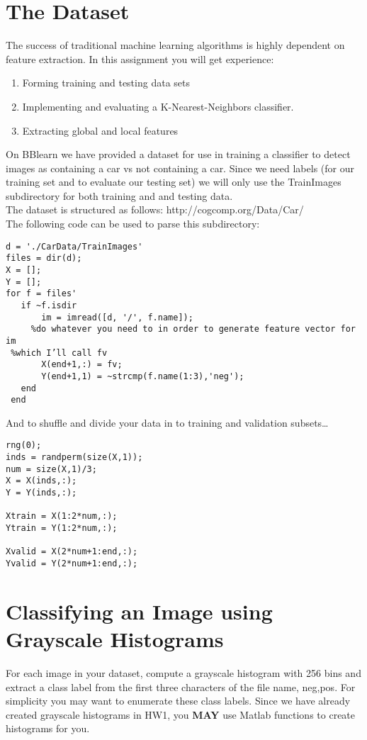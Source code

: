 \documentclass[12pt]{article}
\begin{document}
\newpage
\section*{The Dataset}
The success of traditional machine learning algorithms is highly dependent on feature extraction.  In this assignment you will get experience:
\begin{enumerate}
\item Forming training and testing data sets
\item Implementing and evaluating a K-Nearest-Neighbors classifier.
\item Extracting global and local features
\end{enumerate}

\noindent
On BBlearn we have provided a dataset for use in training a classifier to detect images as containing a car vs not containing a car.  Since we need labels (for our training set and to evaluate our testing set) we will only use the TrainImages subdirectory for both training and and testing data.\\
 
\noindent
The dataset is structured as follows: http://cogcomp.org/Data/Car/ \\

\noindent
The following code can be used to parse this subdirectory:

\begin{verbatim}
d = './CarData/TrainImages'
files = dir(d);
X = [];
Y = [];
for f = files'
   if ~f.isdir
       im = imread([d, '/', f.name]);
	 %do whatever you need to in order to generate feature vector for im
 %which I’ll call fv
       X(end+1,:) = fv;
       Y(end+1,1) = ~strcmp(f.name(1:3),'neg');
   end     
 end
\end{verbatim}

\noindent
And to shuffle and divide your data in to training and validation subsets…

\begin{verbatim}
rng(0);
inds = randperm(size(X,1));
num = size(X,1)/3;
X = X(inds,:);
Y = Y(inds,:);
 
Xtrain = X(1:2*num,:);
Ytrain = Y(1:2*num,:);
 
Xvalid = X(2*num+1:end,:);
Yvalid = Y(2*num+1:end,:);
\end{verbatim}

\newpage
\section{Classifying an Image using Grayscale Histograms}
For each image in your dataset, compute a grayscale histogram with 256 bins and extract a class label from the first three characters of the file name, {neg,pos}.  For simplicity you may want to enumerate these class labels.   Since we have already created grayscale histograms in HW1, you \textbf{MAY} use Matlab functions to create histograms for you.\\
\end{document}
